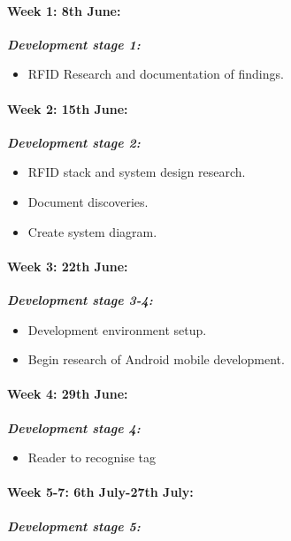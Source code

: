 \documentclass[a4paper, 11pt]{article}
\begin{document}
\iffalse
\paragraph{\textbf{Week 1: 8th June:	}} \textbf{\emph{Development stage 1:}}
\begin{itemize}
  \item  RFID Research and documentation of findings.
\end{itemize}

\paragraph{\textbf{Week 2: 15th June:}} \textbf{\emph{Development stage 2: }}
\begin{itemize}
  \item RFID stack and system design research.
  \item Document discoveries.
  \item Create system diagram. 
\end{itemize}

\paragraph{\textbf{Week 3: 22th June:}}  \textbf{\emph{Development stage 3-4: }}
\begin{itemize}
  \item Development environment setup. 
  \item Begin research of Android mobile development. 
\end{itemize}

\paragraph{\textbf{Week 4: 29th June:}}  \textbf{\emph{Development stage 4: }}
\begin{itemize}
  \item Reader to recognise tag
  \end{itemize}
\paragraph{\textbf{Week 5-7: 6th July-27th July:}} \textbf{\emph{Development stage 5: }}


\end{document}
